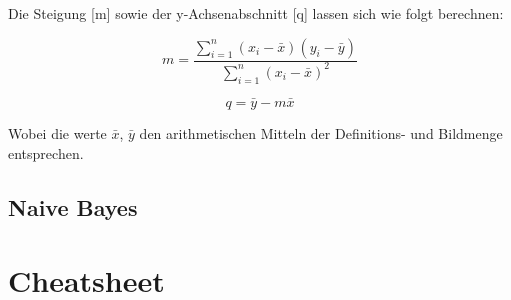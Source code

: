 \documentclass{article}
\begin{document}
Die Steigung [m] sowie der y-Achsenabschnitt [q] lassen sich wie folgt berechnen:

$$m = \dfrac{\sum_{i=1}^n (x_{i} - \bar{x})(y_{i} - \bar{y})}
                       {\sum_{i=1}^n (x_{i} - \bar{x})^{2}}$$

$$q = \bar{y} - m\bar{x}$$

Wobei die werte $\bar{x}$, $\bar{y}$ den arithmetischen Mitteln der Definitions- und Bildmenge entsprechen.

\subsection{Naive Bayes}

\begin{flushleft}
\end{flushleft}




%




\cleardoublepage


\cleardoublepage
\appendix
\section{Cheatsheet}
\end{document}
